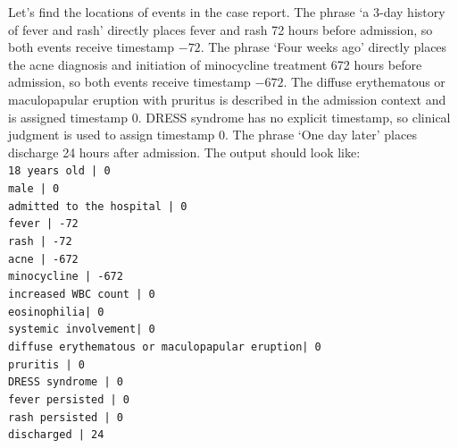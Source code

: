 \begin{tcolorbox}
Let's find the locations of events in the case report.
The phrase ‘a 3-day history of fever and rash’ directly places fever and rash 72 hours before admission, so both events receive timestamp \(-72\). The phrase ‘Four weeks ago’ directly places the acne diagnosis and initiation of minocycline treatment 672 hours before admission, so both events receive timestamp \(-672\). The diffuse erythematous or maculopapular eruption with pruritus is described in the admission context and is assigned timestamp 0. DRESS syndrome has no explicit timestamp, so clinical judgment is used to assign timestamp 0. The phrase ‘One day later’ places discharge 24 hours after admission.
The output should look like:\\

\texttt{18 years old | 0 \\
male | 0 \\
admitted to the hospital | 0 \\
fever | -72 \\
rash | -72 \\
acne | -672 \\
minocycline | -672 \\
increased WBC count | 0 \\
eosinophilia| 0 \\
systemic involvement| 0 \\
diffuse erythematous or maculopapular eruption| 0 \\
pruritis | 0 \\
DRESS syndrome | 0 \\
fever persisted | 0 \\
rash persisted | 0 \\
discharged | 24} \\


\end{tcolorbox}
